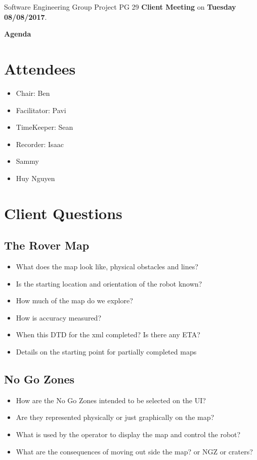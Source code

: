 \documentclass[11pt, a4paper]{article}
\begin{document}
\noindent Software Engineering Group Project PG 29 {\bf Client Meeting} on {\bf Tuesday 08/08/2017}.
\vspace*{10pt}
\begin{center}
\huge \bf Agenda
\end{center}

\section{Attendees}
\begin{itemize}
\item Chair: Ben
\item Facilitator: Pavi
\item TimeKeeper: Sean
\item Recorder: Isaac
\item Sammy
\item Huy Nguyen
\end{itemize}

\section{Client Questions}
\subsection{The Rover Map}
\begin{itemize}
	\item What does the map look like, physical obstacles and lines?
	\item Is the starting location and orientation of the robot known?
	\item How much of the map do we explore?
	\item How is accuracy measured?
	\item When this DTD for the xml completed? Is there any ETA?
	\item Details on the starting point for partially completed maps
\end{itemize}

\subsection{No Go Zones}
\begin{itemize}
	\item How are the No Go Zones intended to be selected on the UI?
	\item Are they represented physically or just graphically on the map?
	\item What is used by the operator to display the map and control the robot?
	\item What are the consequences of moving out side the map? or NGZ or craters?
\end{itemize}
\end{document}
